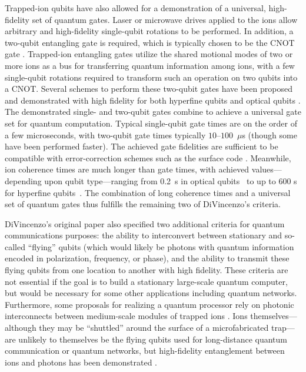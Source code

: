 \documentclass[%
reprint,
 amsmath,amssymb,
]{revtex4-1}
\begin{document}
Trapped-ion qubits have also allowed for a demonstration of a universal, high-fidelity set of quantum gates. Laser or microwave drives applied to the ions allow arbitrary and high-fidelity single-qubit rotations to be performed. In addition, a two-qubit entangling gate is required, which is typically chosen to be the CNOT gate \cite{BarencoElemGates1995}. Trapped-ion entangling gates utilize the shared motional modes of two or more ions as a bus for transferring quantum information among ions, with a few single-qubit rotations required to transform such an operation on two qubits into a CNOT. Several schemes to perform these two-qubit gates have been proposed \cite{CiracZollerGate, MolmerSorensenGate, LeibfriedDidiGate2003} and demonstrated with high fidelity for both hyperfine qubits \cite{Ballance2QubitHyperfineGate2016} and optical qubits \cite{BenhelmMSGate2008}. The demonstrated single- and two-qubit gates combine to achieve a universal gate set for quantum computation. Typical single-qubit gate times are on the order of a few microseconds, with two-qubit gate times typically $10$--$100$~$\mu$s (though some have been performed faster). The achieved gate fidelities are sufficient to be compatible with error-correction schemes such as the surface code \cite{RaussendorfSurfaceCode2007}. Meanwhile, ion coherence times are much longer than gate times, with achieved values---depending upon qubit type---ranging from 0.2~s in optical qubits~\cite{BermudezAssessing2017} to up to 600 s for hyperfine qubits~\cite{bollinger_IEEE_550s_ramsey,Wang10MinuteCoherence2017}. The combination of long coherence times and a universal set of quantum gates thus fulfills the remaining two of DiVincenzo's criteria.

DiVincenzo's original paper also specified two additional criteria for quantum communications purposes: the ability to interconvert between stationary and so-called ``flying'' qubits (which would likely be photons with quantum information encoded in polarization, frequency, or phase), and the ability to transmit these flying qubits from one location to another with high fidelity. These criteria are not essential if the goal is to build a stationary large-scale quantum computer, but would be necessary for some other applications including quantum networks. Furthermore, some proposals for realizing a quantum processor rely on photonic interconnects between medium-scale modules of trapped ions \cite{MonroeModularArch2014}. Ions themselves---although they may be ``shuttled'' around the surface of a microfabricated trap---are unlikely to themselves be the flying qubits used for long-distance quantum communication or quantum networks, but high-fidelity entanglement between ions and photons has been demonstrated \cite{BlinovIonPhotonEntangle2004}.
\end{document}
